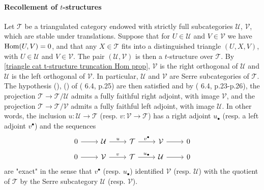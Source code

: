 \paragraph{Recollement of \texorpdfstring{$t$}{t}-structures}
Let $\mathcal{T}$ be a triangulated category endowed with strictly full subcategories $\mathcal{U}$, $\mathcal{V}$, which are stable under translations. Suppose that for $U\in\mathcal{U}$ and $V\in\mathcal{V}$ we have $\mathrm{Hom}(U,V)=0$, and that any $X\in\mathcal{T}$ fits into a distinguished triangle $(U,X,V)$, with $U\in\mathcal{U}$ and $V\in\mathcal{V}$. The pair $(\mathcal{U},\mathcal{V})$ is then a $t$-structure over $\mathcal{T}$. By \cref{triangle cat t-structure truncation Hom prop}, $\mathcal{V}$ is the right orthogonal of $\mathcal{U}$ and $\mathcal{U}$ is the left orthogonal of $\mathcal{V}$. In particular, $\mathcal{U}$ and $\mathcal{V}$ are Serre subcategories of $\mathcal{T}$. The hypothesis (), () of (\cite{tohoku} 6.4, p.25) are then satisfied and by (\cite{tohoku} 6.4, p.23-p.26), the projection $\mathcal{T}\to\mathcal{T}/\mathcal{U}$ admits a fully faithful right adjoint, with image $\mathcal{V}$, and the projection $\mathcal{T}\to\mathcal{T}/\mathcal{V}$ admits a fully faithful left adjoint, with image $\mathcal{U}$. In other words, the inclusion $u:\mathcal{U}\to\mathcal{T}$ (resp. $v:\mathcal{V}\to\mathcal{T}$) has a right adjoint $u_\bullet$ (resp. a left adjoint $v^\bullet$) and the sequences
\[\begin{tikzcd}
0\ar[r]&\mathcal{U}\ar[r,"u"]&\mathcal{T}\ar[r,"v^\bullet"]&\mathcal{V}\ar[r]&0
\end{tikzcd}\]
\vspace*{-4mm}
\[\begin{tikzcd}
0\ar[r]&\mathcal{V}\ar[r,"v"]&\mathcal{T}\ar[r,"u_\bullet"]&\mathcal{U}\ar[r]&0
\end{tikzcd}\]
are "exact" in the sense that $v^\bullet$ (resp. $u_\bullet$) identified $\mathcal{V}$ (resp. $\mathcal{U}$) with the quotient of $\mathcal{T}$ by the Serre subcategory $\mathcal{U}$ (resp. $\mathcal{V}$).\par

